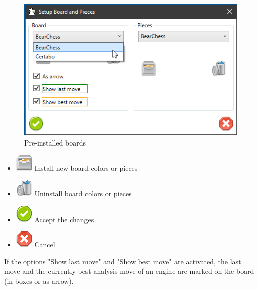 \documentclass[11pt,a4paper]{article}
\begin{document}
\begin{figure}[H]
	\centering
	\includegraphics[scale=0.9]{SettingsBoardAndPieces4.png}
	\caption{Pre-installed boards}
	\label{fig:SettingsBoardAndPieces4}
\end{figure}


\begin{itemize}
	\item \includegraphics[scale=0.5]{file_manager.png} Install new board colors or pieces
	\item \includegraphics[scale=0.5]{bin.png} Uninstall board colors or pieces
	\item \includegraphics[scale=0.5]{accept_button.png} Accept the changes
	\item \includegraphics[scale=0.5]{cancel.png} Cancel
\end{itemize}


If the options "Show last move" and "Show best move" are activated, the last move and the currently best analysis move of an engine are marked on the board (in boxes or as arrow).
\end{document}
